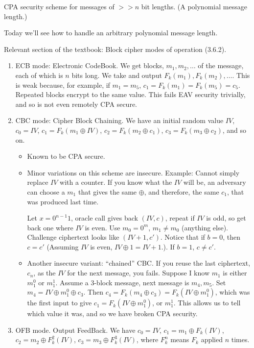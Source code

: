\documentclass[12pt]{article}
\newcommand{\xor}{\oplus}
\begin{document}
CPA security scheme for messages of $>>n$ bit lengths. (A polynomial message length.)

Today we'll see how to handle an arbitrary polynomial message length.

Relevant section of the textbook: Block cipher modes of operation (3.6.2).\begin{enumerate}

\item ECB mode: Electronic CodeBook. We get blocks, $m_1,m_2,\dots$ of the message, each of which is $n$ bits long. We take and output $F_k(m_1),F_k(m_2),\dots$. This is weak because, for example, if $m_1=m_5$, $c_1=F_k(m_1)=F_k(m_5)=c_5$. Repeated blocks encrypt to the same value. This fails EAV security trivially, and so is not even remotely CPA secure.

\item CBC mode: Cipher Block Chaining. We have an initial random value $IV$, $c_0=IV$, $c_1=F_k(m_1\xor IV)$, $c_2=F_k(m_2\xor c_1)$, $c_3=F_k(m_3\xor c_2)$, and so on.\begin{itemize}

\item Known to be CPA secure.

\item Minor variations on this scheme are insecure. Example: Cannot simply replace $IV$ with a counter. If you know what the $IV$ will be, an adversary can choose a $m_1$ that gives the same $\xor$, and therefore, the same $c_1$, that was produced last time.

Let $x=0^{n-1}1$, oracle call gives back $(IV,c)$, repeat if $IV$ is odd, so get back one where $IV$ is even. Use $m_0=0^m$, $m_1\neq m_0$ (anything else). Challenge ciphertext looks like $(IV+1, c')$. Notice that if $b=0$, then $c=c'$ (Assuming $IV$ is even, $IV\xor1=IV+1$.). If $b=1$, $c\neq c'$.

\item Another insecure variant: ``chained'' CBC. If you reuse the last ciphertext, $c_n$, as the $IV$ for the next message, you fails. Suppose I know $m_1$ is either $m_1^0$ or $m_1^1$. Assume a 3-block message, next message is $m_4,m_5$. Set $m_4=IV\xor m_1^0\xor c_3$. Then $c_4=F_k(m_4\xor c_3)=F_k(IV\xor m_1^0)$, which was the first input to give $c_1=F_k(IV\xor m_1^0)$, or $m_1^1$. This allows us to tell which value it was, and so we have broken CPA security.

\end{itemize}

\item OFB mode. Output FeedBack. We have $c_0=IV$, $c_1=m_1\xor F_k(IV)$, $c_2=m_2\xor F_k^2(IV)$, $c_3=m_3\xor F_k^3(IV)$, where $F_k^n$ means $F_k$ applied $n$ times.\begin{itemize}


\end{itemize}
\end{enumerate}
\end{document}
